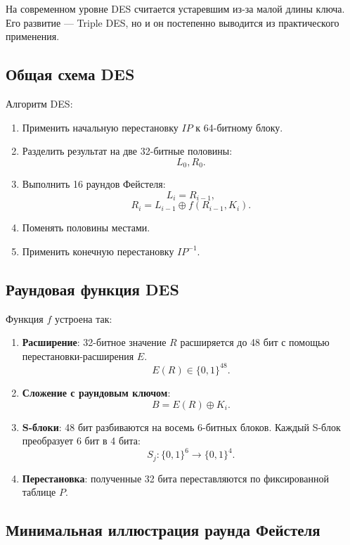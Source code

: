 \documentclass[12pt,a4paper]{article}
\begin{document}
На современном уровне DES считается устаревшим из-за малой длины ключа. Его развитие --- Triple DES, но и он постепенно выводится из практического применения.

\subsection{Общая схема DES}

Алгоритм DES:

\begin{enumerate}
    \item Применить начальную перестановку $IP$ к 64-битному блоку.
    \item Разделить результат на две 32-битные половины:
    \[
        L_0,R_0.
    \]
    \item Выполнить 16 раундов Фейстеля:
    \[
        L_i = R_{i-1},
    \]
    \[
        R_i = L_{i-1} \oplus f(R_{i-1},K_i).
    \]
    \item Поменять половины местами.
    \item Применить конечную перестановку $IP^{-1}$.
\end{enumerate}

\subsection{Раундовая функция DES}

Функция $f$ устроена так:

\begin{enumerate}
    \item \textbf{Расширение}: 32-битное значение $R$ расширяется до 48 бит с помощью перестановки-расширения $E$.
    \[
        E(R) \in \{0,1\}^{48}.
    \]
    \item \textbf{Сложение с раундовым ключом}:
    \[
        B = E(R)\oplus K_i.
    \]
    \item \textbf{S-блоки}: 48 бит разбиваются на восемь 6-битных блоков. Каждый S-блок преобразует 6 бит в 4 бита:
    \[
        S_j:\{0,1\}^6\to \{0,1\}^4.
    \]
    \item \textbf{Перестановка}: полученные 32 бита переставляются по фиксированной таблице $P$.
\end{enumerate}

\subsection{Минимальная иллюстрация раунда Фейстеля}
\end{document}
